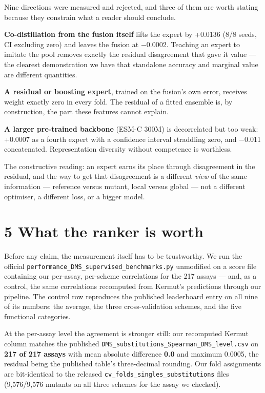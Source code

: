 \documentclass[sigconf,review,nonacm]{acmart}
\begin{document}
Nine directions were measured and rejected, and three of them are worth stating because they constrain
what a reader should conclude.

\textbf{Co-distillation from the fusion itself} lifts the expert by +0.0136 (8/8 seeds, CI excluding zero)
and leaves the fusion at −0.0002. Teaching an expert to imitate the pool removes exactly the residual
disagreement that gave it value --- the clearest demonstration we have that standalone accuracy and
marginal value are different quantities.

\textbf{A residual or boosting expert}, trained on the fusion's own error, receives weight exactly zero in
every fold. The residual of a fitted ensemble is, by construction, the part these features cannot
explain.

\textbf{A larger pre-trained backbone} (ESM-C 300M) is decorrelated but too weak: +0.0007 as a fourth expert
with a confidence interval straddling zero, and −0.011 concatenated. Representation diversity without
competence is worthless.

The constructive reading: an expert earns its place through disagreement in the residual, and the way
to get that disagreement is a different \emph{view} of the same information --- reference versus mutant, local
versus global --- not a different optimiser, a different loss, or a bigger model.

\hypertarget{what-the-ranker-is-worth}{%
\section{5 What the ranker is worth}\label{what-the-ranker-is-worth}}

Before any claim, the measurement itself has to be trustworthy. We run the official
\texttt{performance\_DMS\_supervised\_benchmarks.py} unmodified on a score file containing our per-assay,
per-scheme correlations for the 217 assays --- and, as a control, the same correlations recomputed from
Kermut's predictions through our pipeline. The control row reproduces the published leaderboard entry on
all nine of its numbers: the average, the three cross-validation schemes, and the five functional
categories.

At the per-assay level the agreement is stronger still: our recomputed Kermut column matches the
published \texttt{DMS\_substitutions\_Spearman\_DMS\_level.csv} on \textbf{217 of 217 assays} with mean absolute
difference \textbf{0.0} and maximum 0.0005, the residual being the published table's three-decimal rounding.
Our fold assignments are bit-identical to the released \texttt{cv\_folds\_singles\_substitutions} files
(9,576/9,576 mutants on all three schemes for the assay we checked).
\end{document}
